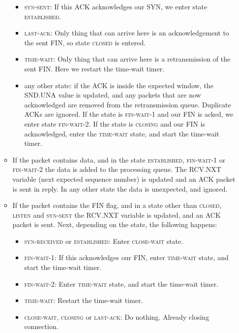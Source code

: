 \documentclass{hitec}
\newcommand{\state}[1]{\textsc{#1}}
\begin{document}
\begin{itemize}
\begin{itemize}
    \begin{itemize}
      \item \state{syn-sent}: If this ACK acknowledges our SYN, we enter state \state{established}. 
      \item \state{last-ack}: Only thing that can arrive here is an acknowledgement to the sent FIN, so state \state{closed} is entered.
      \item \state{time-wait}: Only thing that can arrive here is a retransmission of the sent FIN. Here we restart the time-wait timer.
      \item any other state: if the ACK is inside the expected window, the SND.UNA value is updated, and any packets that are now acknowledged are removed from the retransmission queue. Duplicate ACKs are ignored. If the state is \state{fin-wait-1} and our FIN is acked, we enter state \state{fin-wait-2}. If the state is \state{closing} and our FIN is acknowledged, enter the \state{time-wait} state, and start the time-wait timer. 
    \end{itemize}
    
    \item If the packet contains data, and in the state \state{established}, \state{fin-wait-1} or \state{fin-wait-2} the data is added to the processing queue. The RCV.NXT variable (next expected sequence number) is updated and an ACK packet is sent in reply. In any other state the data is unexpected, and ignored.
    
    \item If the packet contains the FIN flag, and in a state other than \state{closed}, \state{listen} and \state{syn-sent} the RCV.NXT variable is updated, and an ACK packet is sent. Next, depending on the state, the following happens:
    
    \begin{itemize}
      \item \state{syn-received} or \state{established}: Enter \state{close-wait} state.
      \item \state{fin-wait-1}: If this acknowledges our FIN, enter \state{time-wait} state, and start the time-wait timer.
      \item \state{fin-wait-2}: Enter \state{time-wait} state, and start the time-wait timer.
      \item \state{time-wait}: Restart the time-wait timer.
      \item \state{close-wait}, \state{closing} or \state{last-ack}: Do nothing. Already closing connection.
    \end{itemize}
    
    
  \end{itemize}
  
\end{itemize}
\end{document}
